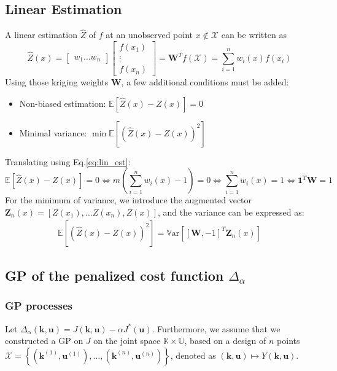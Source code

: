 \documentclass[a4paper,11pt]{article}
\newcommand{\Var}{\mathbb{V}\text{ar}}
\newcommand{\Ex}{\mathbb{E}}
\newcommand{\Kspace}{\mathbb{K}}
\newcommand{\Uspace}{\mathbb{U}}
\begin{document}
\subsection{Linear Estimation}
\label{sec:linear_estimation}
A linear estimation $\hat{Z}$ of $f$ at an unobserved point $x\notin \mathcal{X}$ can be written as
\begin{equation}
  \label{eq:lin_est}
  \hat{Z}(x) =
  \begin{bmatrix}
    w_1 \dots w_n
    \end{bmatrix}
    \begin{bmatrix}
      f(x_1) \\ \vdots \\ f(x_n)
    \end{bmatrix} = \mathbf{W}^Tf(\mathcal{X}) = \sum_{i=1}^n w_i(x) f(x_i)
\end{equation}
Using those kriging weights $\mathbf{W}$, a few additional conditions must be added:
\begin{itemize}
\item Non-biased estimation: $\Ex[\hat{Z}(x) - Z(x)]=0$
\item Minimal variance: $\min \Ex[(\hat{Z}(x) - Z(x))^2]$
\end{itemize}
Translating using Eq.\eqref{eq:lin_est}:
\begin{equation}
  \Ex[\hat{Z}(x) - Z(x)]=0 \iff m(\sum_{i=1}^n w_i(x)-1) = 0 \iff \sum_{i=1}^n w_i(x) = 1 \iff \mathbf{1}^T \mathbf{W} = 1
\end{equation}
For the minimum of variance, we introduce the augmented vector $\mathbf{Z}_n(x) = [Z(x_1),\dots Z(x_n), Z(x)]$, and
the variance can be expressed as:
\begin{align}
  \Ex[(\hat{Z}(x) - Z(x))^2] = \Var\left[[\mathbf{W}, -1]^T \mathbf{Z}_n(x) \right]
\end{align}

\subsection{GP of the penalized cost function $\Delta_{\alpha}$}
\subsubsection{GP processes}
Let $\Delta_{\alpha}(\mathbf{k},\mathbf{u}) = J(\mathbf{k},\mathbf{u}) - \alpha J^*(\mathbf{u})$. Furthermore, we assume that we constructed a GP on $J$ on the joint space $\Kspace \times \Uspace$, based on a design of $n$ points $\mathcal{X} = \left\{(\mathbf{k}^{(1)},\mathbf{u}^{(1)}),\dots,(\mathbf{k}^{(n)},\mathbf{u}^{(n)}) \right\}$, denoted as $(\mathbf{k},\mathbf{u})\mapsto Y(\mathbf{k},\mathbf{u})$.
\end{document}
